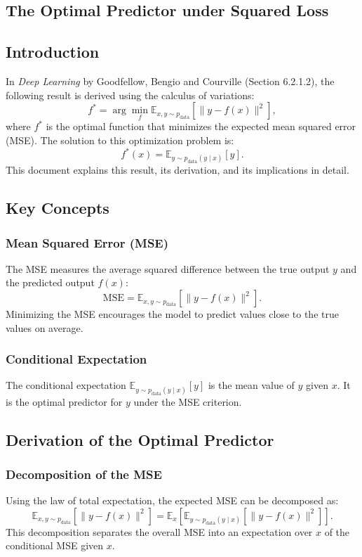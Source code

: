 \begin{notechapter}
\chapter{The Optimal Predictor under Squared Loss}\label{ch:mse-optimal-predictor}

\section{Introduction}
In \textit{Deep Learning} by Goodfellow, Bengio and Courville (Section 6.2.1.2), the following result is derived using the calculus of variations:
\[
f^* = \arg\min_f \mathbb{E}_{x, y \sim p_{\text{data}}} \left[ \| y - f(x) \|^2 \right],
\]
where \( f^* \) is the optimal function that minimizes the expected mean squared error (MSE). The solution to this optimization problem is:
\[
f^*(x) = \mathbb{E}_{y \sim p_{\text{data}}(y \mid x)} [y].
\]
This document explains this result, its derivation, and its implications in detail.

\section{Key Concepts}

\subsection{Mean Squared Error (MSE)}
The MSE measures the average squared difference between the true output \( y \) and the predicted output \( f(x) \):
\[
\text{MSE} = \mathbb{E}_{x, y \sim p_{\text{data}}} \left[ \| y - f(x) \|^2 \right].
\]
Minimizing the MSE encourages the model to predict values close to the true values on average.

\subsection{Conditional Expectation}
The conditional expectation \( \mathbb{E}_{y \sim p_{\text{data}}(y \mid x)} [y] \) is the mean value of \( y \) given \( x \). It is the optimal predictor for \( y \) under the MSE criterion.

\section{Derivation of the Optimal Predictor}

\subsection{Decomposition of the MSE}
Using the law of total expectation, the expected MSE can be decomposed as:
\[
\mathbb{E}_{x, y \sim p_{\text{data}}} \left[ \| y - f(x) \|^2 \right] = \mathbb{E}_{x} \left[ \mathbb{E}_{y \sim p_{\text{data}}(y \mid x)} \left[ \| y - f(x) \|^2 \right] \right].
\]
This decomposition separates the overall MSE into an expectation over \( x \) of the conditional MSE given \( x \).


\end{notechapter}
